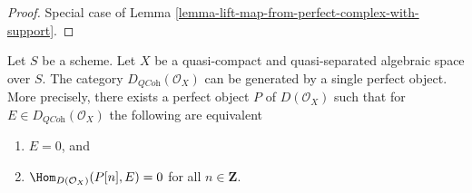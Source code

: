 \begin{proof}
Special case of Lemma \ref{lemma-lift-map-from-perfect-complex-with-support}.
\end{proof}

\begin{theorem}
\label{theorem-bondal-van-den-Bergh}
Let $S$ be a scheme. Let $X$ be a quasi-compact and quasi-separated
algebraic space over $S$. The category
$D_{\textit{QCoh}}(\mathcal{O}_X)$ can be generated by a single
perfect object. More precisely, there exists a perfect object
$P$ of $D(\mathcal{O}_X)$ such that for 
$E \in D_{\textit{QCoh}}(\mathcal{O}_X)$ the following are equivalent
\begin{enumerate}
\item $E = 0$, and
\item $\Hom_{D(\mathcal{O}_X)}(P[n], E) = 0$ for all $n \in \mathbf{Z}$.
\end{enumerate}
\end{theorem}

